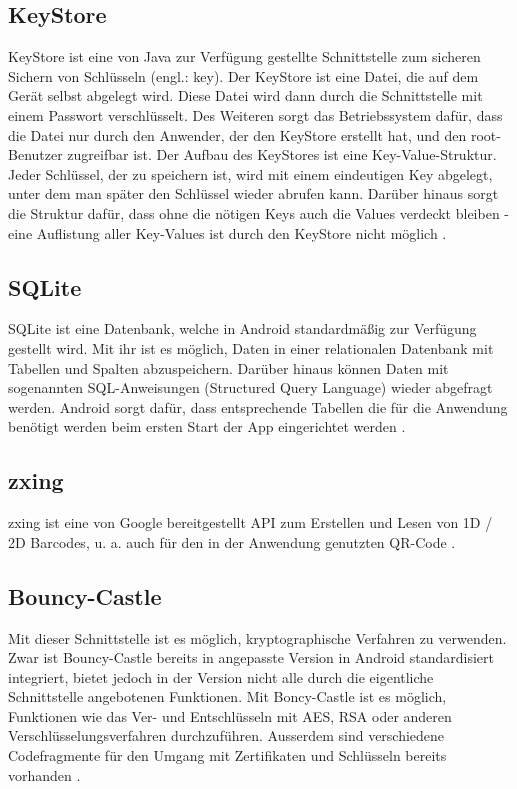 \documentclass[10pt, a4paper,headsepline,pointednumbers]{scrreprt}
\begin{document}
\subsection{KeyStore}
KeyStore ist eine von Java zur Verfügung gestellte Schnittstelle zum sicheren Sichern von Schlüsseln  (engl.: key). Der KeyStore ist eine Datei, die auf dem Gerät selbst abgelegt wird. Diese Datei wird dann durch die Schnittstelle mit einem Passwort verschlüsselt. Des Weiteren sorgt das Betriebssystem dafür, dass die Datei nur durch den Anwender, der den KeyStore erstellt hat, und den root-Benutzer zugreifbar ist. Der Aufbau des KeyStores ist eine Key-Value-Struktur. Jeder Schlüssel, der zu speichern ist, wird mit einem eindeutigen Key abgelegt, unter dem man später den Schlüssel wieder abrufen kann. Darüber hinaus sorgt die Struktur dafür, dass ohne die nötigen Keys auch die Values verdeckt bleiben - eine Auflistung aller Key-Values ist durch den KeyStore nicht möglich \cite{website:javadoc-keystore}.


\subsection{SQLite}
SQLite ist eine Datenbank, welche in Android standardmäßig zur Verfügung gestellt wird. Mit ihr ist es möglich, Daten in einer relationalen Datenbank mit Tabellen und Spalten abzuspeichern. Darüber hinaus können Daten mit sogenannten SQL-Anweisungen (Structured Query Language) wieder abgefragt werden. Android sorgt dafür, dass entsprechende Tabellen die für die Anwendung benötigt werden beim ersten Start der App eingerichtet werden \cite{website:sqlite-main}.


\subsection{zxing}
zxing ist eine von Google bereitgestellt API zum Erstellen und Lesen von 1D / 2D Barcodes, u. a. auch für den in der Anwendung genutzten QR-Code \cite{website:zxing-main}.


\subsection{Bouncy-Castle}
Mit dieser Schnittstelle ist es möglich, kryptographische Verfahren zu verwenden. Zwar ist Bouncy-Castle bereits in angepasste Version in Android standardisiert integriert, bietet jedoch in der Version nicht alle durch die eigentliche Schnittstelle angebotenen Funktionen. Mit Boncy-Castle ist es möglich, Funktionen wie das Ver- und Entschlüsseln mit AES, RSA oder anderen Verschlüsselungsverfahren durchzuführen. Ausserdem sind verschiedene Codefragmente für den Umgang mit Zertifikaten und Schlüsseln bereits vorhanden \cite{website:bouncy-main}.
\end{document}
